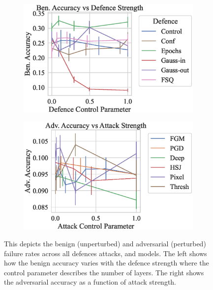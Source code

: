 \begin{figure}[!h]
    \centering
    \begin{subfigure}
        \centering
        \includegraphics[trim={0 10pt 0 10pt},clip,width=.4\textwidth]{cifar/def_param_vs_accuracy.eps}
    \end{subfigure}
    \begin{subfigure}
        \centering
        \includegraphics[trim={0 10pt 0 10pt},clip,width=.4\textwidth]{cifar/atk_param_vs_accuracy.eps}
    \end{subfigure}
    \caption{This depicts the benign (unperturbed) and adversarial (perturbed) failure rates across all defences attacks, and models. The left shows how the benign accuracy varies with the defence strength where the control parameter describes the number of layers. The right shows the adversarial accuracy as a function of attack strength.}
    \label{fig:cifar_strength}
\end{figure}

